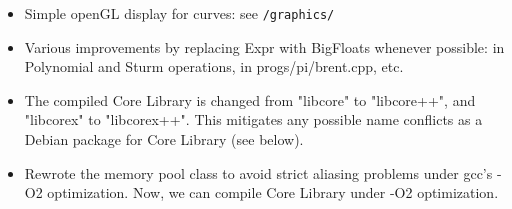 \documentclass[12pt]{article}
\begin{document}
\begin{itemize}
   \item Simple openGL display for curves: see
   	\extdir\texttt{/graphics/}

   \item Various improvements by replacing Expr with BigFloats
   	whenever possible: in Polynomial and Sturm operations,
	in progs/pi/brent.cpp, etc.

   \item The compiled Core Library is changed from
   	"libcore" to "libcore++", and "libcorex" to "libcorex++".  
	This mitigates any possible name conflicts as a Debian package 
	for Core Library (see below).

   \item Rewrote the memory pool class to avoid strict aliasing
   	problems under gcc's -O2 optimization.  Now, we can compile
	Core Library under -O2 optimization.


\end{itemize}
\end{document}
